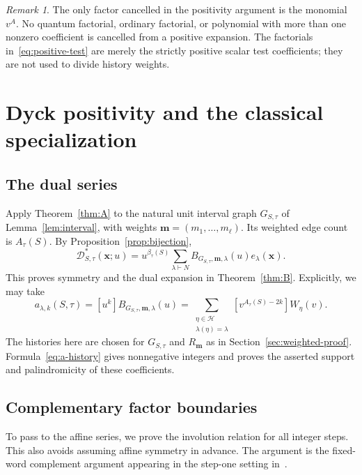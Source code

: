 \documentclass[11pt,reqno]{amsart}
\newcommand{\xx}{\mathbf x}
\newcommand{\mm}{\mathbf m}
\newcommand{\DD}{\mathcal D}
\newcommand{\HH}{\mathcal H}
\theoremstyle{definition}
\theoremstyle{remark}
\newtheorem{remark}[theorem]{Remark}
\numberwithin{equation}{section}
\begin{document}
\begin{remark}\label{rem:no-division}
The only factor cancelled in the positivity argument is the monomial
$v^A$.  No quantum factorial, ordinary factorial, or polynomial with
more than one nonzero coefficient is cancelled from a positive
expansion.  The factorials in~\eqref{eq:positive-test} are merely the
strictly positive scalar test coefficients; they are not used to
divide history weights.
\end{remark}

\section{Dyck positivity and the classical specialization}\label{sec:dyck-proof}

\subsection{The dual series}
Apply Theorem~\ref{thm:A} to the natural unit interval graph
$G_{S,\tau}$ of Lemma~\ref{lem:interval}, with weights
$\mm=(m_1,\ldots,m_\ell)$.  Its weighted edge count is $A_\tau(S)$.
By Proposition~\ref{prop:bijection},
\begin{equation}\label{eq:dual-positive}
 \DD^*_{S,\tau}(\xx;u)
   =u^{\beta_\tau(S)}
       \sum_{\lambda\vdash N}B_{G_{S,\tau},\mm,\lambda}(u)e_\lambda(\xx).
\end{equation}
This proves symmetry and the dual expansion in Theorem~\ref{thm:B}.
Explicitly, we may take
\begin{equation}\label{eq:a-history}
 a_{\lambda,k}(S,\tau)
  =[u^k]B_{G_{S,\tau},\mm,\lambda}(u)
  =\sum_{\substack{\eta\in\HH\\\lambda(\eta)=\lambda}}
       [v^{A_\tau(S)-2k}]W_\eta(v).
\end{equation}
The histories here are chosen for $G_{S,\tau}$ and $R_{\mm}$ as in
Section~\ref{sec:weighted-proof}.  Formula~\eqref{eq:a-history} gives
nonnegative integers and proves the asserted support and
palindromicity of these coefficients.

\subsection{Complementary factor boundaries}
To pass to the affine series, we prove the involution relation for
all integer steps.  This also avoids assuming affine symmetry in
advance.  The argument is the fixed-word complement argument appearing
in the step-one setting in~\cite[Corollary~3.20]{Hawkes2026}.
\end{document}
